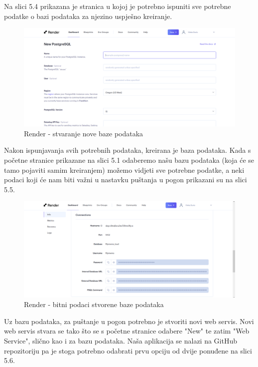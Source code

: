			Na slici 5.4 prikazana je stranica u kojoj je potrebno ispuniti sve potrebne podatke o bazi podataka za njezino uspješno kreiranje.
			
			\begin{figure}[H]
				\includegraphics[width=\textwidth]{slike/deploy3.PNG}
				\caption{Render - stvaranje nove baze podataka}
				\label{fig:deployment3}
			\end{figure}
			
			Nakon ispunjavanja svih potrebnih podataka, kreirana je baza podataka. Kada s početne stranice prikazane na slici 5.1 odaberemo našu bazu podataka (koja će se tamo pojaviti samim kreiranjem) možemo vidjeti sve potrebne podatke, a neki podaci koji će nam biti važni u nastavku puštanja u pogon prikazani su na slici 5.5.
			
			\begin{figure}[H]
				\includegraphics[width=\textwidth]{slike/deploy4.PNG}
				\caption{Render - bitni podaci stvorene baze podataka}
				\label{fig:deployment4}
			\end{figure}
			
			Uz bazu podataka, za puštanje u pogon potrebno je stvoriti novi web servis. Novi web servis stvara se tako što se s početne stranice odabere "New" te zatim "Web Service", slično kao i za bazu podataka. Naša aplikacija se nalazi na GitHub repozitoriju pa je stoga potrebno odabrati prvu opciju od dvije ponuđene na slici 5.6.
			
